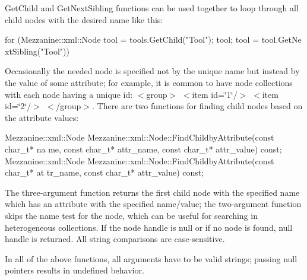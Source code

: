  \par
 GetChild and GetNextSibling functions can be used together to loop through all child nodes with the desired name like this: 
\begin{DoxyCode}
 for (Mezzanine::xml::Node tool = tools.GetChild("Tool"); tool; tool = tool.GetNe
      xtSibling("Tool"))
     {}
\end{DoxyCode}
 Occasionally the needed node is specified not by the unique name but instead by the value of some attribute; for example, it is common to have node collections with each node having a unique id: $<$group$>$ $<$item id=\char`\"{}1\char`\"{}/$>$ $<$item id=\char`\"{}2\char`\"{}/$>$ $<$/group$>$. There are two functions for finding child nodes based on the attribute values: 
\begin{DoxyCode}
 Mezzanine::xml::Node Mezzanine::xml::Node::FindChildbyAttribute(const char_t* na
      me, const char_t* attr_name, const char_t* attr_value) const;
 Mezzanine::xml::Node Mezzanine::xml::Node::FindChildbyAttribute(const char_t* at
      tr_name, const char_t* attr_value) const;
\end{DoxyCode}
 The three-\/argument function returns the first child node with the specified name which has an attribute with the specified name/value; the two-\/argument function skips the name test for the node, which can be useful for searching in heterogeneous collections. If the node handle is null or if no node is found, null handle is returned. All string comparisons are case-\/sensitive. \par
 \par
 In all of the above functions, all arguments have to be valid strings; passing null pointers results in undefined behavior.

